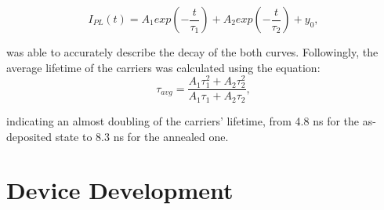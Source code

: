 \begin{equation}
    I_{PL}(t) = A_1exp(-\frac{t}{\tau_1}) + A_2exp(-\frac{t}{\tau_2}) + y_0,
\end{equation}

was able to accurately describe the decay of the both curves. Followingly, the average lifetime of the carriers was calculated using the equation: 
\begin{equation}
    \tau_{avg} = \frac{A_1 \tau_1^2 + A_2 \tau_2^2}{A_1 \tau_1 + A_2 \tau_2},
\end{equation}

indicating an almost doubling of the carriers' lifetime, from 4.8 ns for the as-deposited state to 8.3 ns for the annealed one.


\section{Device Development}

